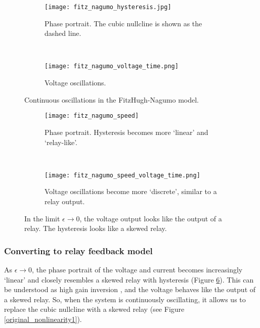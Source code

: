\documentclass[a4paper, 12pt]{article}
\begin{document}
\begin{figure}
\centering
    \begin{subfigure}[b]{0.45\textwidth}
        \texttt{[image: fitz\_nagumo\_hysteresis.jpg]}
        \caption{Phase portrait. The cubic nullcline is shown as the dashed line.}
        \label{fig:FN_intro_hysteresis}
    \end{subfigure}
    ~ %
    \begin{subfigure}[b]{0.45\textwidth}
        \texttt{[image: fitz\_nagumo\_voltage\_time.png]}
        \caption{Voltage oscillations.}
        \label{fig:FN_intro_voltage}
    \end{subfigure}
    \caption{Continuous oscillations in the FitzHugh-Nagumo model.}
    \label{fig:FN_intro}
\end{figure}

\begin{figure}
\centering
    \begin{subfigure}[b]{0.45\textwidth}
        \texttt{[image: fitz\_nagumo\_speed]}
        \caption{Phase portrait. Hysteresis becomes more `linear' and `relay-like'.}
        \label{fig:FN_eps_hysteresis}
    \end{subfigure}
    ~ %
    \begin{subfigure}[b]{0.45\textwidth}
        \texttt{[image: fitz\_nagumo\_speed\_voltage\_time.png]}
        \caption{Voltage oscillations become more `discrete', similar to a relay output.}
        \label{fig:FN_eps_voltage}
    \end{subfigure}
    \caption{In the limit $\epsilon\rightarrow0$, the voltage output looks like the output of a relay. The hysteresis looks like a skewed relay. }
    \label{fig:FN_eps_zero}
\end{figure}

\subsubsection{Converting to relay feedback model}\label{sec:FN_to_relay}

As $\epsilon\rightarrow 0$, the phase portrait of the voltage and current becomes increasingly `linear' and closely resembles a skewed relay with hysteresis (Figure \ref{fig:FN_eps_zero}). This can be understood as high gain inversion \cite{goodwin}, and the voltage behaves like the output of a skewed relay. So, when the system is continuously oscillating, it allows us to replace the cubic nullcline with a skewed relay (see Figure \ref{original_nonlinearity1}). 
\end{document}
